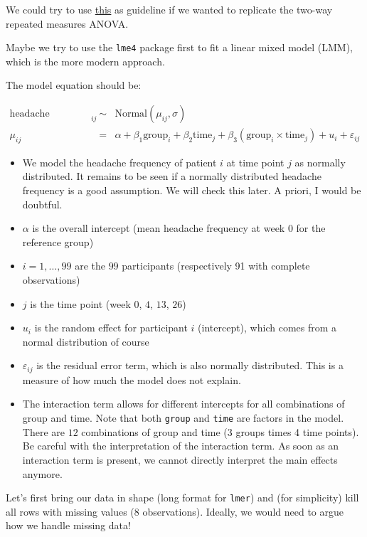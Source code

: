\documentclass[
]{book}
\providecommand{\tightlist}{%
  \setlength{\itemsep}{0pt}\setlength{\parskip}{0pt}}
\begin{document}
We could try to use \href{https://www.r-bloggers.com/2021/04/repeated-measures-of-anova-in-r-complete-tutorial/}{this}
as guideline if we wanted to replicate the two-way repeated measures ANOVA.

Maybe we try to use the \texttt{lme4} package first to fit a linear mixed model (LMM), which
is the more modern approach.

The model equation should be:

\[
\begin{array}{rcl}
\text{headache frequency}_{ij} &\sim& \text{Normal}(\mu_{ij}, \sigma) \\
\mu_{ij} &=& \alpha + \beta_1 \text{group}_i + \beta_2 \text{time}_j + \beta_3 (\text{group}_i \times \text{time}_j) + u_i + \varepsilon_{ij}
\end{array}
\]

\begin{itemize}
\tightlist
\item
  We model the headache frequency of patient \(i\) at time point \(j\) as normally distributed.
  It remains to be seen if a normally distributed headache frequency is a good assumption.
  We will check this later. A priori, I would be doubtful.
\item
  \(\alpha\) is the overall intercept (mean headache frequency at week \(0\) for the reference group)
\item
  \(i = 1, \ldots, 99\) are the \(99\) participants (respectively 91 with complete observations)
\item
  \(j\) is the time point (week \(0\), \(4\), \(13\), \(26\))
\item
  \(u_i\) is the random effect for participant \(i\) (intercept), which comes from a normal distribution of course
\item
  \(\varepsilon_{ij}\) is the residual error term, which is also normally distributed.
  This is a measure of how much the model does not explain.
\item
  The interaction term allows for different intercepts for all combinations of group and time.
  Note that both \texttt{group} and \texttt{time} are factors in the model. There are \(12\) combinations of group and time
  (3 groups times 4 time points).
  Be careful with the interpretation of the interaction term. As soon as an interaction term
  is present, we cannot directly interpret the main effects anymore.
\end{itemize}

Let's first bring our data in shape (long format for \texttt{lmer}) and
(for simplicity) kill all rows with missing values (\(8\) observations).
Ideally, we would need to argue how we handle missing data!
\end{document}
